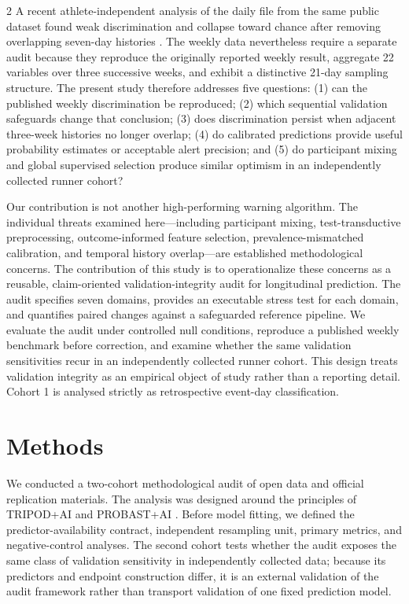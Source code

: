 \documentclass[11pt,a4paper]{article}
\begin{document}
\begin{multicols}{2}
A recent athlete-independent analysis of the daily file from the same public dataset found weak discrimination and collapse toward chance after removing overlapping seven-day histories \cite{qiao2026}. The weekly data nevertheless require a separate audit because they reproduce the originally reported weekly result, aggregate 22 variables over three successive weeks, and exhibit a distinctive 21-day sampling structure. The present study therefore addresses five questions: (1) can the published weekly discrimination be reproduced; (2) which sequential validation safeguards change that conclusion; (3) does discrimination persist when adjacent three-week histories no longer overlap; (4) do calibrated predictions provide useful probability estimates or acceptable alert precision; and (5) do participant mixing and global supervised selection produce similar optimism in an independently collected runner cohort?

Our contribution is not another high-performing warning algorithm. The individual threats examined here---including participant mixing, test-transductive preprocessing, outcome-informed feature selection, prevalence-mismatched calibration, and temporal history overlap---are established methodological concerns. The contribution of this study is to operationalize these concerns as a reusable, claim-oriented validation-integrity audit for longitudinal prediction. The audit specifies seven domains, provides an executable stress test for each domain, and quantifies paired changes against a safeguarded reference pipeline. We evaluate the audit under controlled null conditions, reproduce a published weekly benchmark before correction, and examine whether the same validation sensitivities recur in an independently collected runner cohort. This design treats validation integrity as an empirical object of study rather than a reporting detail. Cohort 1 is analysed strictly as retrospective event-day classification.

\section{Methods}

We conducted a two-cohort methodological audit of open data and official replication materials. The analysis was designed around the principles of TRIPOD+AI and PROBAST+AI \cite{collins2024,moons2025}. Before model fitting, we defined the predictor-availability contract, independent resampling unit, primary metrics, and negative-control analyses. The second cohort tests whether the audit exposes the same class of validation sensitivity in independently collected data; because its predictors and endpoint construction differ, it is an external validation of the audit framework rather than transport validation of one fixed prediction model.


\end{multicols}
\end{document}
